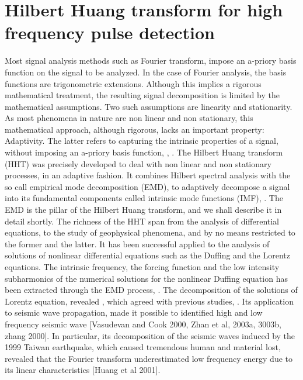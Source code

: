 \documentclass[../Main/thesis.tex]{subfiles}
\begin{document}
\chapter[Hilbert Huang transform for high frequency pulse detection]{Hilbert Huang transform for high frequency pulse detection}
\label{sec:hht}

Most signal analysis methods such as Fourier transform, impose an a-priory basis function on the signal to be analyzed. In the case of Fourier analysis, the basis functions are trigonometric extensions. Although this implies a rigorous mathematical treatment, the resulting signal decomposition is limited by the mathematical assumptions. Two such assumptions are linearity and stationarity. As most phenomena in nature are non linear and non stationary, this mathematical approach, although rigorous, lacks an important property: Adaptivity. The latter refers to capturing the intrinsic properties of a signal, without imposing an a-priory basis function, \cite{huang98}, \cite{huang08}. 
\justify 
The Hilbert Huang transform (HHT) was precisely developed to deal with non linear and non stationary processes, in an adaptive fashion. It combines Hilbert spectral analysis with the so call empirical mode decomposition (EMD), to adaptively decompose a signal into its fundamental components called intrinsic mode functions (IMF), \cite{huang98}.
The EMD is the pillar of the Hilbert Huang transform, and we shall describe it in detail shortly. The richness of the HHT span from the analysis of differential equations, to the study of geophysical phenomena, and by no means restricted to the former and the latter. It has been successful applied to the analysis of solutions of nonlinear differential equations such as the Duffing and the Lorentz equations. The intrinsic frequency, the forcing function and the low intensity subharmonics of the numerical solutions for the nonlinear Duffing equation has been extracted through the EMD process, \cite{huang98}. The decomposition of the solutions of Lorentz equation, revealed , which agreed with previous studies, \cite{huang98}. Its application to seismic wave propagation, made it possible to identified high and low frequency seismic wave [Vasudevan and Cook 2000, Zhan et al, 2003a, 3003b, zhang 2000]. In particular, its decomposition of the seismic waves induced by the 1999 Taiwan earthquake, which caused tremendous human and material lost,  revealed that the Fourier transform underestimated low frequency energy due to its linear characteristics [Huang et al 2001]. 
\end{document}
